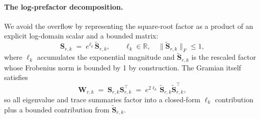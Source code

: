 \paragraph{The log-prefactor decomposition.}
We avoid the overflow by representing the square-root factor as a product of an explicit log-domain scalar and a bounded matrix:
\begin{equation}
\mathbf{S}_{r,k} \;=\; e^{\ell_{k}}\,\tilde{\mathbf{S}}_{r,k}, \qquad \ell_{k}\in\mathbb{R},\quad \|\tilde{\mathbf{S}}_{r,k}\|_{F}\leq 1,
\label{eq:supp-interareal-control-gram-logfactor}
\end{equation}
where $\ell_{k}$ accumulates the exponential magnitude and $\tilde{\mathbf{S}}_{r,k}$ is the rescaled factor whose Frobenius norm is bounded by 1 by construction. The Gramian itself satisfies
\begin{equation}
\mathbf{W}_{r,k} \;=\; \mathbf{S}_{r,k}\mathbf{S}_{r,k}^{\!\top} \;=\; e^{2\ell_{k}}\,\tilde{\mathbf{S}}_{r,k}\tilde{\mathbf{S}}_{r,k}^{\!\top},
\end{equation}
so all eigenvalue and trace summaries factor into a closed-form $\ell_{k}$ contribution plus a bounded contribution from $\tilde{\mathbf{S}}_{r,k}$.

